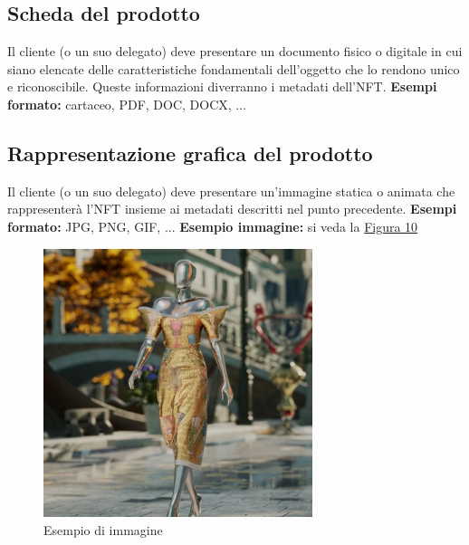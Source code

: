 \documentclass[12pt]{report}
\begin{document}
\subsection{Scheda del prodotto}
Il cliente (o un suo delegato) deve presentare un documento fisico o digitale in cui siano elencate delle caratteristiche fondamentali dell'oggetto che lo rendono unico e riconoscibile. Queste informazioni diverranno i metadati dell'NFT.\newline
\textbf{Esempi formato:} cartaceo, PDF, DOC, DOCX, ...
\subsection{Rappresentazione grafica del prodotto}
Il cliente (o un suo delegato) deve presentare un'immagine statica o animata che rappresenterà l'NFT insieme ai metadati descritti nel punto precedente.\newline
\textbf{Esempi formato:} JPG, PNG, GIF, ...\newline
\textbf{Esempio immagine:} si veda la \hyperref[fig:DG]{Figura 10}
\begin{figure}[H]
    \centering
    \includegraphics[width=0.7\textwidth]{DG.jpg}
    \captionsetup{justification=centering}
    \caption{Esempio di immagine \cite{Sedici}}
    \label{fig:DG}
\end{figure}
\end{document}
